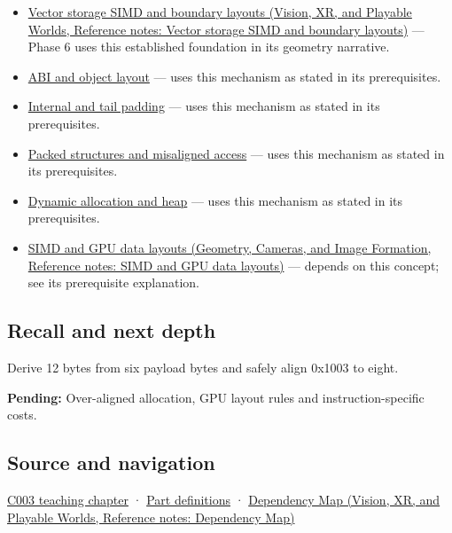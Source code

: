 \hypertarget{appendix-a1f7c53b4742-used-by}{}

\begin{itemize}
\item
  \href{../07-Vision-XR-and-Playable-Worlds/main.pdf\#nameddest=appendix-26bf6bf2fb8b}{Vector storage SIMD and boundary layouts (Vision, XR, and Playable Worlds, Reference notes: Vector storage SIMD and boundary layouts)} --- Phase 6 uses this established foundation in its geometry narrative.
\item
  \hyperref[appendix-c4ac6bb0fff8]{ABI and object layout} --- uses this mechanism as stated in its prerequisites.
\item
  \hyperref[appendix-f52f8c5a3afd]{Internal and tail padding} --- uses this mechanism as stated in its prerequisites.
\item
  \hyperref[appendix-0682dbfc5f0e]{Packed structures and misaligned access} --- uses this mechanism as stated in its prerequisites.
\item
  \hyperref[appendix-c3480f7d9ff3]{Dynamic allocation and heap} --- uses this mechanism as stated in its prerequisites.
\item
  \href{../03-Geometry-Cameras-and-Image-Formation/main.pdf\#nameddest=appendix-3c7b1a56de01}{SIMD and GPU data layouts (Geometry, Cameras, and Image Formation, Reference notes: SIMD and GPU data layouts)} --- depends on this concept; see its prerequisite explanation.
\end{itemize}

\subsection{Recall and next depth}\label{appendix-a1f7c53b4742-recall-and-next-depth}

\hypertarget{appendix-a1f7c53b4742-recall-and-next-depth}{}

Derive 12 bytes from six payload bytes and safely align 0x1003 to eight.

\textbf{Pending:} Over-aligned allocation, GPU layout rules and instruction-specific costs.

\subsection{Source and navigation}\label{appendix-a1f7c53b4742-source-and-navigation}

\hypertarget{appendix-a1f7c53b4742-source-and-navigation}{}

\hyperref[01-foundations-i-ch002-where-the-bytes-live]{C003 teaching chapter} · \hyperref[appendix-fd090d982a15-m003---parts-41-60]{Part definitions} · \href{../07-Vision-XR-and-Playable-Worlds/main.pdf\#nameddest=appendix-4ad47bdd269a}{Dependency Map (Vision, XR, and Playable Worlds, Reference notes: Dependency Map)}
